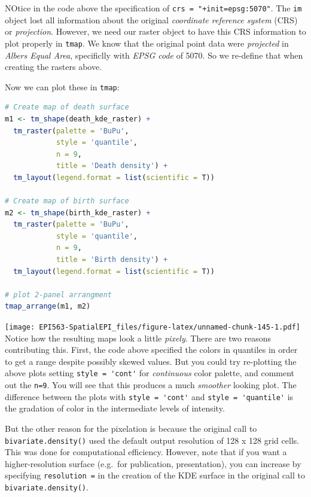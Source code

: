 \documentclass[
]{book}
\newcommand{\passthrough}[1]{#1}
\begin{document}
NOtice in the code above the specification of \passthrough{\lstinline!crs = "+init=epsg:5070"!}. The \passthrough{\lstinline!im!} object lost all information about the original \emph{coordinate reference system} (CRS) or \emph{projection}. However, we need our raster object to have this CRS information to plot properly in \passthrough{\lstinline!tmap!}. We know that the original point data were \emph{projected} in \emph{Albers Equal Area}, specificlly with \emph{EPSG code} of 5070. So we re-define that when creating the rasters above.

Now we can plot these in \passthrough{\lstinline!tmap!}:

\begin{lstlisting}[language=R]
# Create map of death surface
m1 <- tm_shape(death_kde_raster) + 
  tm_raster(palette = 'BuPu',
            style = 'quantile',
            n = 9,
            title = 'Death density') +
  tm_layout(legend.format = list(scientific = T))

# Create map of birth surface
m2 <- tm_shape(birth_kde_raster) +
  tm_raster(palette = 'BuPu',
            style = 'quantile',
            n = 9,
            title = 'Birth density') +
  tm_layout(legend.format = list(scientific = T))

# plot 2-panel arrangment
tmap_arrange(m1, m2)
\end{lstlisting}

\texttt{[image: EPI563-SpatialEPI\_files/figure-latex/unnamed-chunk-145-1.pdf]}
Notice how the resulting maps look a little \emph{pixely}. There are two reasons contributing this. First, the code above specified the colors in quantiles in order to get a range despite possibly skewed values. But you could try re-plotting the above plots setting \passthrough{\lstinline!style = 'cont'!} for \emph{continuous} color palette, and comment out the \passthrough{\lstinline!n=9!}. You will see that this produces a much \emph{smoother} looking plot. The difference between the plots with \passthrough{\lstinline!style = 'cont'!} and \passthrough{\lstinline!style = 'quantile'!} is the gradation of color in the intermediate levels of intensity.

But the other reason for the pixelation is because the original call to \passthrough{\lstinline!bivariate.density()!} used the default output resolution of 128 x 128 grid cells. This was done for computational efficiency. However, note that if you want a higher-resolution surface (e.g.~for publication, presentation), you can increase by specifying \passthrough{\lstinline!resolution =!} in the creation of the KDE surface in the original call to \passthrough{\lstinline!bivariate.density()!}.
\end{document}
